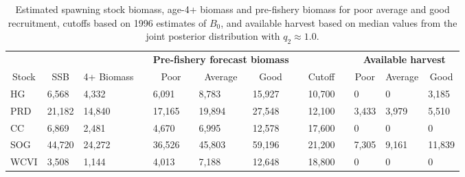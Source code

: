 %
\begin{table}[!tbp]
 \small
 \caption{Estimated spawning stock biomass,  age-4+ biomass and pre-fishery
			biomass for poor average and good recruitment,  cutoffs based on 1996 estimates of $B_0$,  and 
			available harvest based on median values from the joint posterior distribution with $q_2 \approx 1.0$.\label{TableCatchAdvice1}} 
 \begin{center}
 \begin{tabular}{lllclllclclll}\hline\hline
\multicolumn{3}{c}{\bfseries }&
\multicolumn{1}{c}{\bfseries }&
\multicolumn{3}{c}{\bfseries Pre-fishery forecast biomass}&
\multicolumn{1}{c}{\bfseries }&
\multicolumn{1}{c}{\bfseries }&
\multicolumn{1}{c}{\bfseries }&
\multicolumn{3}{c}{\bfseries Available harvest}
\tabularnewline \cline{1-13}
\multicolumn{1}{c}{Stock}&\multicolumn{1}{c}{SSB}&\multicolumn{1}{c}{4+ Biomass}&\multicolumn{1}{c}{}&\multicolumn{1}{c}{Poor}&\multicolumn{1}{c}{Average}&\multicolumn{1}{c}{Good}&\multicolumn{1}{c}{}&\multicolumn{1}{c}{Cutoff}&\multicolumn{1}{c}{}&\multicolumn{1}{c}{Poor}&\multicolumn{1}{c}{Average}&\multicolumn{1}{c}{Good}\tabularnewline
\hline
HG& 6,568& 4,332&& 6,091& 8,783&15,927&&10,700&&     0&     0& 3,185\tabularnewline
PRD&21,182&14,840&&17,165&19,894&27,548&&12,100&& 3,433& 3,979& 5,510\tabularnewline
CC& 6,869& 2,481&& 4,670& 6,995&12,578&&17,600&&     0&     0&     0\tabularnewline
SOG&44,720&24,272&&36,526&45,803&59,196&&21,200&& 7,305& 9,161&11,839\tabularnewline
WCVI& 3,508& 1,144&& 4,013& 7,188&12,648&&18,800&&     0&     0&     0\tabularnewline
\hline
\end{tabular}

\end{center}

\end{table}

